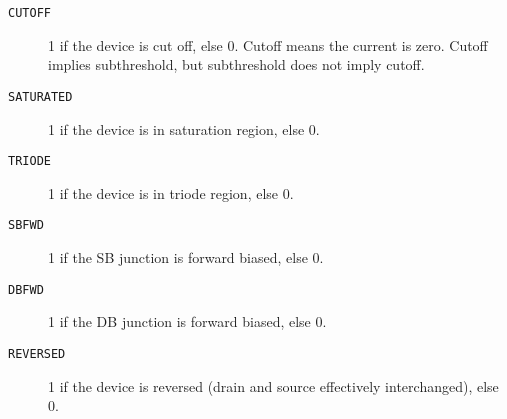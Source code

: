\begin{description}
\item[{\tt CUTOFF}]
1 if the device is cut off, else 0.  Cutoff means the current is zero.
Cutoff implies subthreshold, but subthreshold does not imply cutoff.

\item[{\tt SATURATED}]
1 if the device is in saturation region, else 0.

\item[{\tt TRIODE}]
1 if the device is in triode region, else 0. 

\item[{\tt SBFWD}]
1 if the SB junction is forward biased, else 0.

\item[{\tt DBFWD}]
1 if the DB junction is forward biased, else 0.

\item[{\tt REVERSED}]
1 if the device is reversed (drain and source effectively
interchanged), else 0.

\end{description}
